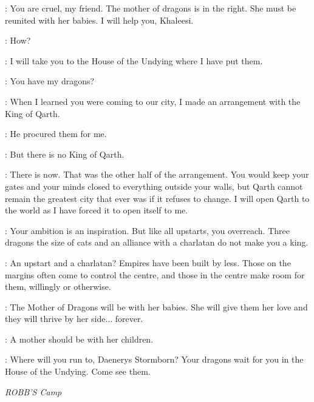 \PYAT: You are cruel, my friend. The mother of dragons is in the right. She must be reunited with her babies. I will help you, Khaleesi.

\DAENERYS: How?

\PYAT: I will take you to the House of the Undying where I have put them.

\DAENERYS: You have my dragons?

\PYAT: When I learned you were coming to our city, I made an arrangement with the King of Qarth.


\PYAT: He procured them for me.

\DAENERYS: But there is no King of Qarth.


\XARO: There is now. That was the other half of the arrangement. You would keep your gates and your minds closed to everything outside your walls, but Qarth cannot remain the greatest city that ever was if it refuses to change. I will open Qarth to the world as I have forced it to open itself to me.

\SPICEKING: Your ambition is an inspiration. But like all upstarts, you overreach. Three dragons the size of cats and an alliance with a charlatan do not make you a king.

\XARO: An upstart and a charlatan? Empires have been built by less. Those on the margins often come to control the centre, and those in the centre make room for them, willingly or otherwise.

\PYAT: The Mother of Dragons will be with her babies. She will give them her love and they will thrive by her side$\ldots$ forever.


\PYAT: A mother should be with her children.


\PYAT: Where will you run to, Daenerys Stormborn? Your dragons wait for you in the House of the Undying. Come see them.



\scene

\textit{ROBB'S Camp}


